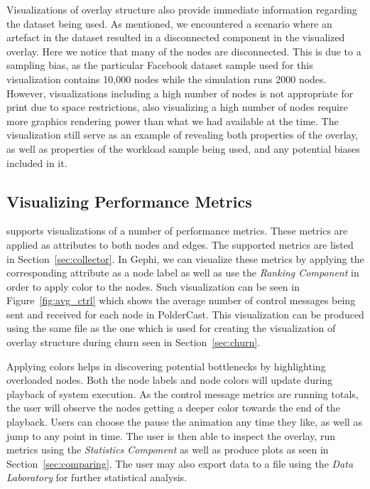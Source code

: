 Visualizations of overlay structure also provide immediate information
regarding the dataset being used. As mentioned, we encountered a
scenario where an artefact in the dataset resulted in a disconnected
component in the visualized overlay. Here we notice that many of the
nodes are disconnected. This is due to a sampling bias, as the
particular Facebook dataset sample used for this visualization contains
10,000 nodes while the simulation runs 2000 nodes. However,
visualizations including a high number of nodes is not appropriate for
print due to space restrictions, also visualizing a high number of nodes
require more graphics rendering power than what we had available at the
time. The visualization still serve as an example of revealing both
properties of the overlay, as well as properties of the workload sample
being used, and any potential biases included in it.

\subsection{Visualizing Performance Metrics}
\label{sec:viz_perf}

\demo{} supports visualizations of a number of performance metrics.
These metrics are applied as attributes to both nodes and edges. The
supported metrics are listed in Section~\ref{sec:collector}. In Gephi,
we can visualize these metrics by applying the corresponding attribute
as a node label as well as use the \emph{Ranking Component} in order to
apply color to the nodes. Such visualization can be seen in
Figure~\ref{fig:avg_ctrl} which shows the average number of control
messages being sent and received for each node in PolderCast. This visualization can
be produced using the same \gexf{} file as the one which is used for
creating the visualization of overlay structure during churn seen in Section~\ref{sec:churn}.

Applying colors helps in discovering potential bottlenecks by highlighting
overloaded nodes. Both the node labels and node colors will update during
playback of system execution. As the control message metrics are running
totals, the user will observe the nodes getting a deeper color towards
the end of the playback. Users can choose the pause the animation any
time they like, as well as jump to any point in time. The user is then
able to inspect the overlay, run metrics using the \emph{Statistics
    Component} as well as produce plots as seen in
Section~\ref{sec:comparing}. The user may also export data to a \csv
file using the \emph{Data Laboratory} for further statistical analysis.

